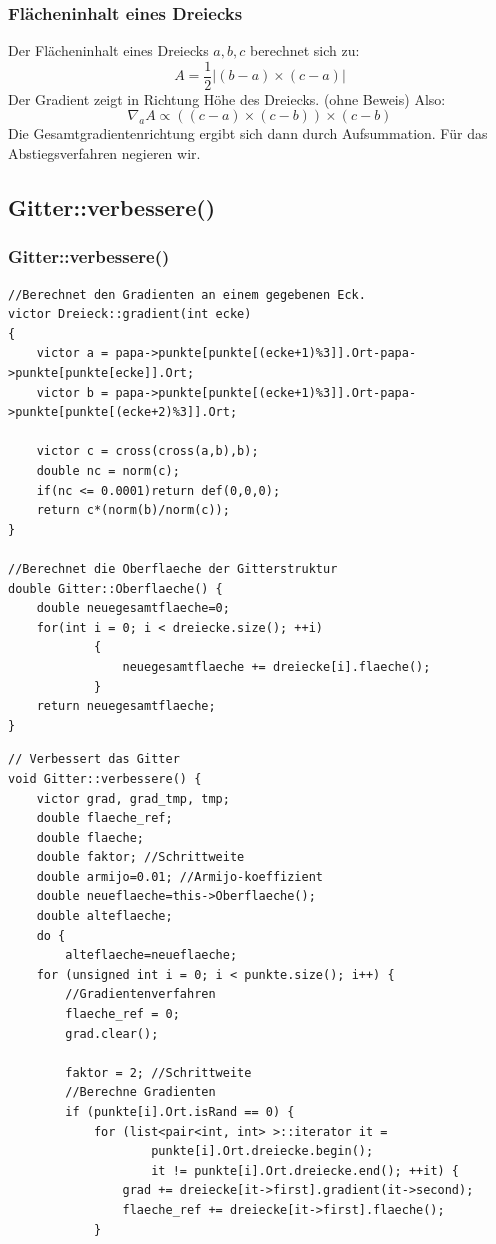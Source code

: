 \documentclass{beamer}
\begin{document}
\begin{frame}
\frametitle{Flächeninhalt eines Dreiecks}
Der Flächeninhalt eines Dreiecks $a, b, c$ berechnet sich zu:
\[
	A=\frac 1 2 |(b-a)\times(c-a)|
\]
Der Gradient zeigt in Richtung Höhe des Dreiecks. (ohne Beweis) Also:
\[
	\nabla_a A\varpropto ((c-a) \times (c-b)) \times (c-b)
\]
Die Gesamtgradientenrichtung ergibt sich dann durch Aufsummation. Für das Abstiegsverfahren negieren wir.
\end{frame}
\subsection{Gitter::verbessere()}
\begin{frame}[fragile]
\frametitle{Gitter::verbessere()}
\begin{lstlisting}
//Berechnet den Gradienten an einem gegebenen Eck.
victor Dreieck::gradient(int ecke)
{
    victor a = papa->punkte[punkte[(ecke+1)%3]].Ort-papa->punkte[punkte[ecke]].Ort;
    victor b = papa->punkte[punkte[(ecke+1)%3]].Ort-papa->punkte[punkte[(ecke+2)%3]].Ort;

    victor c = cross(cross(a,b),b);
    double nc = norm(c);
    if(nc <= 0.0001)return def(0,0,0);
    return c*(norm(b)/norm(c));
}

//Berechnet die Oberflaeche der Gitterstruktur
double Gitter::Oberflaeche() {
	double neuegesamtflaeche=0;
	for(int i = 0; i < dreiecke.size(); ++i)
	        {
	            neuegesamtflaeche += dreiecke[i].flaeche();
	        }
	return neuegesamtflaeche;
}
\end{lstlisting}
\end{frame}

\begin{frame}[fragile]
\begin{lstlisting}
// Verbessert das Gitter
void Gitter::verbessere() {
	victor grad, grad_tmp, tmp;
	double flaeche_ref;
	double flaeche;
	double faktor; //Schrittweite
	double armijo=0.01; //Armijo-koeffizient
	double neueflaeche=this->Oberflaeche();
	double alteflaeche;
	do {
		alteflaeche=neueflaeche;
	for (unsigned int i = 0; i < punkte.size(); i++) {
		//Gradientenverfahren
		flaeche_ref = 0;
		grad.clear();

		faktor = 2; //Schrittweite
		//Berechne Gradienten
		if (punkte[i].Ort.isRand == 0) {
			for (list<pair<int, int> >::iterator it =
					punkte[i].Ort.dreiecke.begin();
					it != punkte[i].Ort.dreiecke.end(); ++it) {
				grad += dreiecke[it->first].gradient(it->second);
				flaeche_ref += dreiecke[it->first].flaeche();
			}
\end{lstlisting}
\end{frame}
\end{document}
